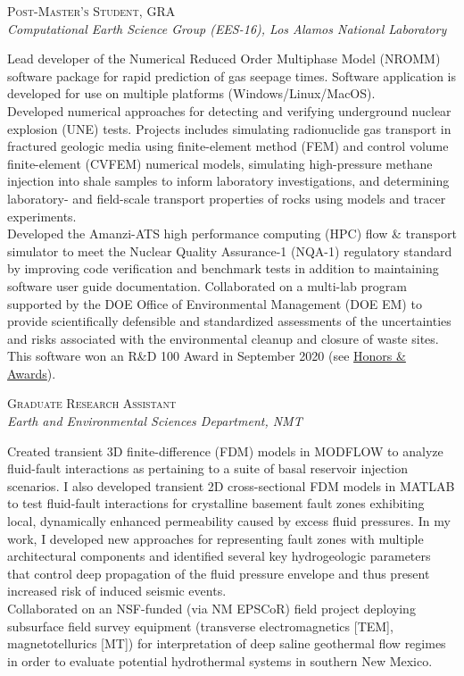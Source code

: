 \documentclass[11pt, letterpaper]{article}
\newcommand{\years}[1]{\marginnote{\scriptsize #1}}
\begin{document}
\years{2017 - 2019}\textsc{Post-Master's Student, GRA}\\
\textit{Computational Earth Science Group (EES-16), Los Alamos National Laboratory}
\begin{adjustwidth}{5pt}{0pt}
	Lead developer of the Numerical Reduced Order Multiphase Model (NROMM)
	software package for rapid prediction of gas seepage times. Software
	application is developed for use on multiple platforms
	(Windows/Linux/MacOS).\\
	Developed numerical approaches for detecting and verifying underground
	nuclear explosion (UNE) tests. Projects includes simulating
	radionuclide gas transport in fractured geologic media using finite-element
	method (FEM) and control volume finite-element (CVFEM) numerical models,
	simulating high-pressure methane injection into shale samples to inform
	laboratory investigations, and determining laboratory- and field-scale
	transport properties of rocks using models and tracer experiments.\\
	Developed the Amanzi-ATS high performance computing (HPC) flow \& transport
	simulator to meet the Nuclear Quality Assurance-1 (NQA-1) regulatory
	standard by improving code verification and benchmark tests in addition to
	maintaining software user guide documentation. Collaborated
	on a multi-lab program supported by the DOE Office of Environmental
	Management (DOE EM) to provide scientifically defensible and standardized
	assessments of the uncertainties and risks associated with the
	environmental cleanup and closure of waste sites. This software won
	an R\&D 100 Award in September 2020 (see \hyperref[sec:awards]{Honors \&
	Awards}).
\end{adjustwidth}

\years{2016 - 2017}\textsc{Graduate Research Assistant}\\
\textit{Earth and Environmental Sciences Department, NMT}
\begin{adjustwidth}{5pt}{0pt}
	Created transient 3D finite-difference (FDM) models in MODFLOW to analyze
	fluid-fault interactions as pertaining to a suite of basal reservoir
	injection scenarios. I also developed transient 2D cross-sectional FDM
	models in MATLAB to test fluid-fault interactions for crystalline basement
	fault zones exhibiting local, dynamically enhanced permeability caused by
	excess fluid pressures. In my work, I developed new approaches for
	representing fault zones with multiple architectural components and
	identified several key hydrogeologic parameters that control deep
	propagation of the fluid pressure envelope and thus present increased risk
	of induced seismic events.\\
	Collaborated on an NSF-funded (via NM EPSCoR) field project deploying
	subsurface field survey equipment (transverse electromagnetics [TEM],
	magnetotellurics [MT]) for interpretation of deep saline geothermal flow
	regimes in order to evaluate potential hydrothermal systems in southern New
	Mexico.
\end{adjustwidth}
\end{document}
